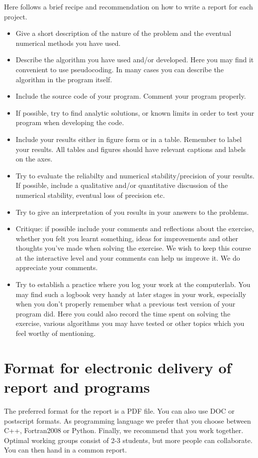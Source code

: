 \documentclass[10pt]{article}
\begin{document}
Here follows a brief recipe and recommendation on how to write a report for each
project.
\begin{itemize}
\item Give a short description of the nature of the problem and the eventual 
numerical methods you have used.
\item Describe the algorithm you have used and/or developed. Here you may find it convenient
to use pseudocoding. In many cases you can describe the algorithm
in the program itself.

\item Include the source code of your program. Comment your program properly.
\item If possible, try to find analytic solutions, or known limits
in order to test your program when developing the code.
\item Include your results either in figure form or in a table. Remember to
       label your results. All tables and figures should have relevant captions
       and labels on the axes.
\item Try to evaluate the reliabilty and numerical stability/precision
of your results. If possible, include a qualitative and/or quantitative
discussion of the numerical stability, eventual loss of precision etc. 

\item Try to give an interpretation of you results in your answers to 
the problems.
\item Critique: if possible include your comments and reflections about the 
exercise, whether you felt you learnt something, ideas for improvements and 
other thoughts you've made when solving the exercise.
We wish to keep this course at the interactive level and your comments can help
us improve it. We do appreciate your comments. 
\item Try to establish a practice where you log your work at the 
computerlab. You may find such a logbook very handy at later stages
in your work, especially when you don't properly remember 
what a previous test version 
of your program did. Here you could also record 
the time spent on solving the exercise, various algorithms you may have tested
or other topics which you feel worthy of mentioning.
\end{itemize}



\section*{Format for electronic delivery of report and programs}
%
The preferred format for the report is a PDF file. You can also
use DOC or postscript formats. 
As programming language we prefer that you choose between C++, Fortran2008 or Python.
Finally, 
we recommend that you work together. Optimal working groups consist of 
2-3 students, but more people can collaborate. You can then hand in a common report. 
\end{document}
